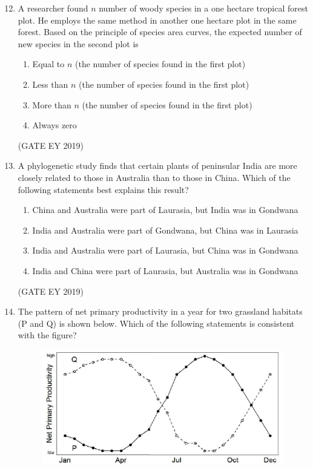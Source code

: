 \documentclass[journal,12pt,onecolumn]{IEEEtran}
\theoremstyle{remark}
\begin{document}
\begin{enumerate}[leftmargin=*]
\setcounter{enumi}{11}
\item A researcher found $n$ number of woody species in a one hectare tropical forest plot. He employs the same method in another one hectare plot in the same forest. Based on the principle of species area curves, the expected number of new species in the second plot is

\begin{multicols}{2}
\begin{enumerate}[nosep]
\item Equal to $n$ (the number of species found in the first plot)
\item Less than $n$ (the number of species found in the first plot)
\item More than $n$ (the number of species found in the first plot)
\item Always zero
\end{enumerate}
\end{multicols}
\hfill{(GATE EY 2019)}
\item A phylogenetic study finds that certain plants of peninsular India are more closely related to those in Australia than to those in China. Which of the following statements best explains this result?

\begin{enumerate}[nosep]
\item China and Australia were part of Laurasia, but India was in Gondwana
\item India and Australia were part of Gondwana, but China was in Laurasia
\item India and Australia were part of Laurasia, but China was in Gondwana
\item India and China were part of Laurasia, but Australia was in Gondwana
\end{enumerate}
\hfill{(GATE EY 2019)}
\item The pattern of net primary productivity in a year for two grassland habitats (P and Q) is shown below. Which of the following statements is consistent with the figure?
\begin{figure}[h]
    \centering
    \includegraphics[]{figs/14.png}
\end{figure}



\end{enumerate}
\end{document}
